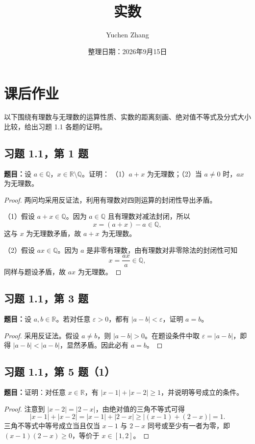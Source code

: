 \documentclass[UTF8, fontset=fandol, a4paper, 12pt]{ctexart}
\title{实数}
\author{Yuchen Zhang}
\date{整理日期：2026年9月15日}
\makeatletter
\newcommand{\R}{\mathbb{R}}
\theoremstyle{definition}
\renewcommand{\maketitle}{%
  \begin{center}
    {\LARGE\bfseries \@title\par}\vspace{0.6em}
    \@author\par\vspace{0.2em}
    {\small \@date\par}
  \end{center}
}
\makeatother
\begin{document}
\maketitle

\section{课后作业}
以下围绕有理数与无理数的运算性质、实数的距离刻画、绝对值不等式及分式大小比较，给出习题 1.1 各题的证明。

\subsection{习题 1.1，第 1 题}
\noindent\textbf{题目：}设 $a\in\mathbb{Q}$，$x\in\R\setminus\mathbb{Q}$。证明：
（1）$a+x$ 为无理数；（2）当 $a\ne0$ 时，$ax$ 为无理数。

\begin{proof}
两问均采用反证法，利用有理数对四则运算的封闭性导出矛盾。

（1）假设 $a+x\in\mathbb{Q}$。因为 $a\in\mathbb{Q}$ 且有理数对减法封闭，所以
\[
 x=(a+x)-a\in\mathbb{Q},
\]
这与 $x$ 为无理数矛盾，故 $a+x$ 为无理数。

（2）假设 $ax\in\mathbb{Q}$。因为 $a$ 是非零有理数，由有理数对非零除法的封闭性可知
\[
 x=\frac{ax}{a}\in\mathbb{Q},
\]
同样与题设矛盾，故 $ax$ 为无理数。
\end{proof}

\subsection{习题 1.1，第 3 题}
\noindent\textbf{题目：}设 $a,b\in\R$。若对任意 $\varepsilon>0$，都有 $|a-b|<\varepsilon$，证明 $a=b$。

\begin{proof}
采用反证法。假设 $a\ne b$，则 $|a-b|>0$。在题设条件中取 $\varepsilon=|a-b|$，即得 $|a-b|<|a-b|$，显然矛盾。因此必有 $a=b$。
\end{proof}

\subsection{习题 1.1，第 5 题（1）}
\noindent\textbf{题目：}证明：对任意 $x\in\R$，有 $|x-1|+|x-2|\ge1$，并说明等号成立的条件。

\begin{proof}
注意到 $|x-2|=|2-x|$，由绝对值的三角不等式可得
\[
 |x-1|+|x-2|=|x-1|+|2-x|
 \ge |(x-1)+(2-x)|=1.
\]
三角不等式中等号成立当且仅当 $x-1$ 与 $2-x$ 同号或至少有一者为零，即 $(x-1)(2-x)\ge0$，等价于 $x\in[1,2]$。
\end{proof}
\end{document}
